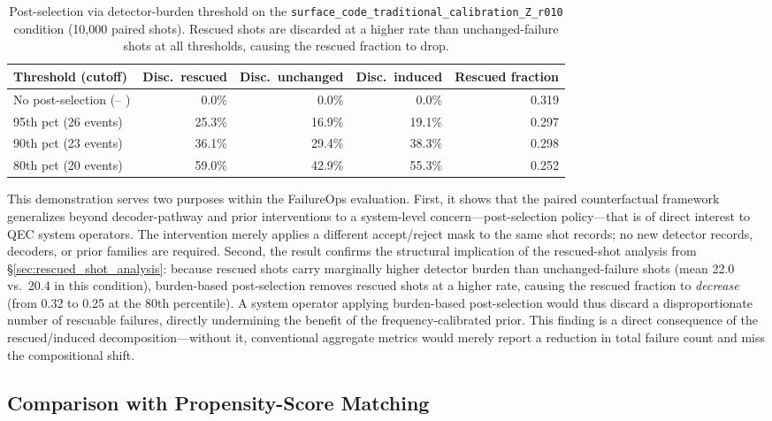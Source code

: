 \begin{table}[t]
\centering
\caption{Post-selection via detector-burden threshold on the \texttt{surface\_code\_traditional\_calibration\_Z\_r010} condition (10,000 paired shots). Rescued shots are discarded at a higher rate than unchanged-failure shots at all thresholds, causing the rescued fraction to drop.}
\label{tab:postselection}
\begin{tabular}{lrrrr}
\toprule
Threshold (cutoff) & Disc.\ rescued & Disc.\ unchanged & Disc.\ induced & Rescued fraction \\
\midrule
No post-selection (-- ) & 0.0\% & 0.0\% & 0.0\% & 0.319 \\
95th pct (26 events) & 25.3\% & 16.9\% & 19.1\% & 0.297 \\
90th pct (23 events) & 36.1\% & 29.4\% & 38.3\% & 0.298 \\
80th pct (20 events) & 59.0\% & 42.9\% & 55.3\% & 0.252 \\
\bottomrule
\end{tabular}
\end{table}

This demonstration serves two purposes within the FailureOps evaluation. First, it shows that the paired counterfactual framework generalizes beyond decoder-pathway and prior interventions to a system-level concern---post-selection policy---that is of direct interest to QEC system operators. The intervention merely applies a different accept/reject mask to the same shot records; no new detector records, decoders, or prior families are required. Second, the result confirms the structural implication of the rescued-shot analysis from \S\ref{sec:rescued_shot_analysis}: because rescued shots carry marginally higher detector burden than unchanged-failure shots (mean 22.0 vs.\ 20.4 in this condition), burden-based post-selection removes rescued shots at a higher rate, causing the rescued fraction to \emph{decrease} (from 0.32 to 0.25 at the 80th percentile). A system operator applying burden-based post-selection would thus discard a disproportionate number of rescuable failures, directly undermining the benefit of the frequency-calibrated prior. This finding is a direct consequence of the rescued/induced decomposition---without it, conventional aggregate metrics would merely report a reduction in total failure count and miss the compositional shift.

\subsection{Comparison with Propensity-Score Matching}
\label{sec:psm_comparison}

